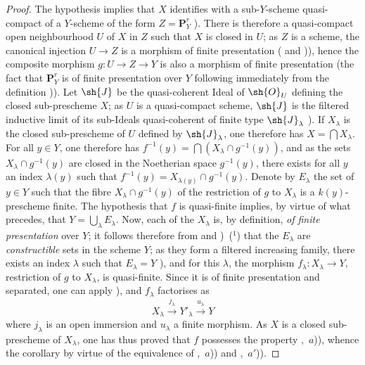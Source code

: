 \begin{proof}
The hypothesis implies that $X$ identifies with a sub-$Y$-scheme quasi-compact of a $Y$-scheme of the form $Z=\mathbf{P}^r_Y$ ).
There is therefore a quasi-compact open neighbourhood $U$ of $X$ in $Z$ such that $X$ is closed in $U$; as $Z$ is a scheme, the canonical injection $U\to Z$ is a morphism of finite presentation ( and )), hence the composite morphism $g:U\to Z\to Y$ is also a morphism of finite presentation (the fact that $\mathbf{P}^r_Y$ is of finite presentation over $Y$ following immediately from the definition )).
Let $\sh{J}$ be the quasi-coherent Ideal of $\sh{O}_U$ defining the closed sub-prescheme $X$; as $U$ is a quasi-compact scheme, $\sh{J}$ is the filtered inductive limit of its sub-Ideals quasi-coherent of finite type $\sh{J}_\lambda$ ).
If $X_\lambda$ is the closed sub-prescheme of $U$ defined by $\sh{J}_\lambda$, one therefore has $X=\bigcap X_\lambda$.
For all $y\in Y$, one therefore has $f^{-1}(y)=\bigcap(X_\lambda\cap g^{-1}(y))$, and as the sets $X_\lambda\cap g^{-1}(y)$ are closed in the Noetherian space $g^{-1}(y)$, there exists for all $y$ an index $\lambda(y)$ such that $f^{-1}(y)=X_{\lambda(y)}\cap g^{-1}(y)$.
Denote by $E_\lambda$ the set of $y\in Y$ such that the fibre $X_\lambda\cap g^{-1}(y)$ of the restriction of $g$ to $X_\lambda$ is a $k(y)$-prescheme finite.
The hypothesis that $f$ is quasi-finite implies, by virtue of what precedes, that $Y=\bigcup_\lambda E_\lambda$.
Now, each of the $X_\lambda$ is, by definition, \emph{of finite presentation} over $Y$; it follows therefore from  and )~($^1$) that the $E_\lambda$ are \emph{constructible} sets in the scheme $Y$; as they form a filtered increasing family, there exists an index $\lambda$ such that $E_\lambda=Y$ ), and for this $\lambda$, the morphism $f_\lambda:X_\lambda\to Y$, restriction of $g$ to $X_\lambda$, is quasi-finite. Since it is of finite presentation and separated, one can apply ), and $f_\lambda$ factorises as
\[
X_\lambda\xrightarrow{j_\lambda}Y'_\lambda\xrightarrow{u_\lambda}Y
\]
where $j_\lambda$ is an open immersion and $u_\lambda$ a finite morphism.
As $X$ is a closed sub-prescheme of $X_\lambda$, one has thus proved that $f$ possesses the property ,~$a$)), whence the corollary by virtue of the equivalence of ,~$a$)) and ,~$a'$)).
\end{proof}

